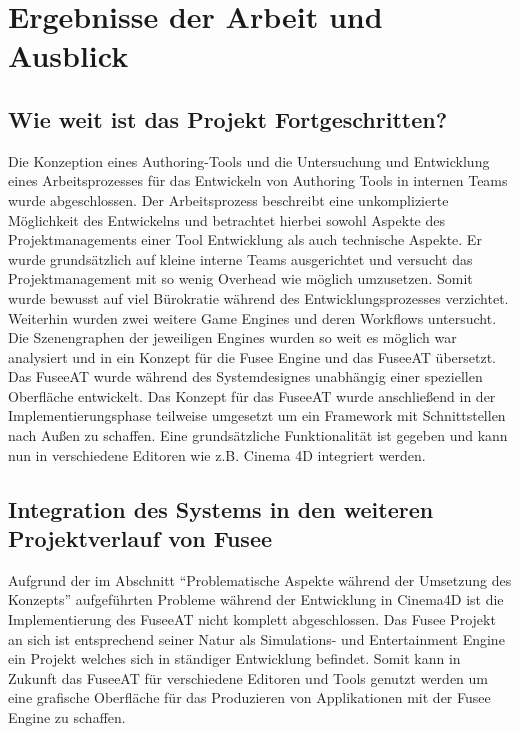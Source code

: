 \documentclass[pagesize, paper=a4, fontsize=12pt, titlepage=true, headings=small, headnosepline, abstractoff, liststotoc, nochapterprefix, plainheadsepline, twoside]{scrreprt}
\begin{document}





\chapter{Ergebnisse der Arbeit und Ausblick}
\section{Wie weit ist das Projekt Fortgeschritten?}
Die Konzeption eines Authoring-Tools und die Untersuchung und Entwicklung eines Arbeitsprozesses für das Entwickeln von Authoring Tools in internen Teams wurde abgeschlossen. Der Arbeitsprozess beschreibt eine unkomplizierte Möglichkeit des Entwickelns und betrachtet hierbei sowohl Aspekte des Projektmanagements einer Tool Entwicklung als auch technische Aspekte. Er wurde grundsätzlich auf kleine interne Teams ausgerichtet und versucht das Projektmanagement mit so wenig Overhead wie möglich umzusetzen. Somit wurde bewusst auf viel Bürokratie während des Entwicklungsprozesses verzichtet. Weiterhin wurden zwei weitere Game Engines und deren Workflows untersucht. Die Szenengraphen der jeweiligen Engines wurden so weit es möglich war analysiert und in ein Konzept für die Fusee Engine und das FuseeAT übersetzt. Das FuseeAT wurde während des Systemdesignes unabhängig einer speziellen Oberfläche entwickelt. Das Konzept für das FuseeAT wurde anschließend in der Implementierungsphase teilweise umgesetzt um ein Framework mit Schnittstellen nach Außen zu schaffen. Eine grundsätzliche Funktionalität ist gegeben und kann nun in verschiedene Editoren wie z.B. Cinema 4D integriert werden. 

\section{Integration des Systems in den weiteren Projektverlauf von Fusee}
Aufgrund der im Abschnitt “Problematische Aspekte während der Umsetzung des Konzepts” aufgeführten Probleme während der Entwicklung in Cinema4D ist die Implementierung des FuseeAT nicht komplett abgeschlossen. Das Fusee Projekt an sich ist entsprechend seiner Natur als Simulations- und Entertainment Engine ein Projekt welches sich in ständiger Entwicklung befindet. Somit kann in Zukunft das FuseeAT für verschiedene Editoren und Tools genutzt werden um eine grafische Oberfläche für das Produzieren von Applikationen mit der Fusee Engine zu schaffen. 
\end{document}
